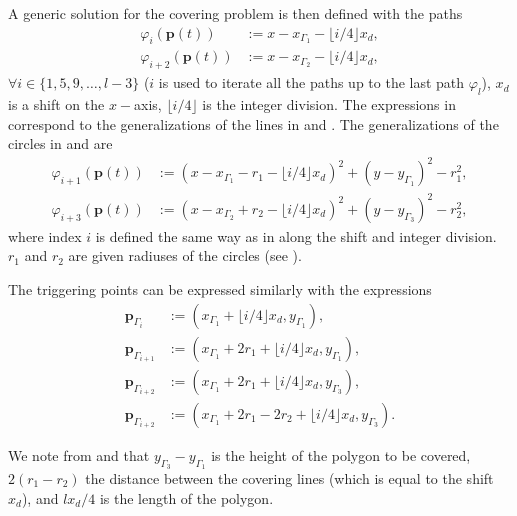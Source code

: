 A generic solution for the covering problem is then defined with the paths
\begin{subequations}\label{eq:line-gene}\begin{align}
  \varphi_i(\mathbf{p}(t))&:=x-x_{\Gamma_1}-\lfloor i/4\rfloor x_d,\\
  \varphi_{i+2}(\mathbf{p}(t))&:=x-x_{\Gamma_2}-\lfloor i/4\rfloor x_d,
\end{align}
\end{subequations}
$\forall i\in\{1,5,9,\dots,l-3\}$ ($i$ is used to iterate all the paths up to the last path $\varphi_l$), $x_d$ is a shift on the $x-$axis, $\lfloor i/4\rfloor$ is the integer division. The expressions in  correspond to the generalizations of the lines in  and . The generalizations of the circles in  and  are
\begin{subequations}\begin{align}
  \varphi_{i+1}(\mathbf{p}(t))&:=(x-x_{\Gamma_1}-r_1-\lfloor i/4\rfloor x_d)^2+(y-y_{\Gamma_1})^2-r_1^2,\\
  \varphi_{i+3}(\mathbf{p}(t))&:=(x-x_{\Gamma_2}+r_2-\lfloor i/4\rfloor x_d)^2+(y-y_{\Gamma_3})^2-r_2^2,\label{eq:second-circ-gene}
\end{align}
\end{subequations}
where index $i$ is defined the same way as in  along the shift and integer division. $r_1$ and $r_2$ are given radiuses of the circles (see ).

The triggering points can be expressed similarly with the expressions
\begin{subequations}\label{eq:trigs-gene}\begin{align}
  \mathbf{p}_{\Gamma_i}&:=(x_{\Gamma_1}+\lfloor i/4\rfloor x_d,y_{\Gamma_1}),\\
  \mathbf{p}_{\Gamma_{i+1}}&:=(x_{\Gamma_1}+2r_1+\lfloor i/4\rfloor x_d,y_{\Gamma_1}),\\
  \mathbf{p}_{\Gamma_{i+2}}&:=(x_{\Gamma_1}+2r_1+\lfloor i/4\rfloor x_d,y_{\Gamma_3}),\\
  \mathbf{p}_{\Gamma_{i+2}}&:=(x_{\Gamma_1}+2r_1-2r_2+\lfloor i/4\rfloor x_d,y_{\Gamma_3})\label{eq:last-trig-gene}.
\end{align}
\end{subequations}

We note from  and  that $y_{\Gamma_3}-y_{\Gamma_1}$ is the height of the polygon to be covered, $2(r_1-r_2)$ the distance between the covering lines (which is equal to the shift $x_d$), and $lx_d/4$ is the length of the polygon.

